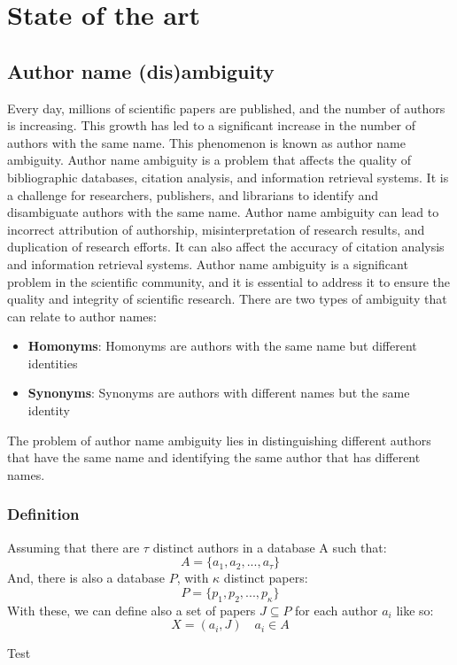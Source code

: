 \chapter{State of the art}
\label{chapters:state_of_the_art}

\section{Author name (dis)ambiguity}
\label{chapters:sections:author_name_ambiguity}
Every day, millions of scientific papers are published, and the number of authors is increasing. This growth has led to a significant increase in the number of authors with the same name. This phenomenon is known as author name ambiguity. Author name ambiguity is a problem that affects the quality of bibliographic databases, citation analysis, and information retrieval systems. It is a challenge for researchers, publishers, and librarians to identify and disambiguate authors with the same name. Author name ambiguity can lead to incorrect attribution of authorship, misinterpretation of research results, and duplication of research efforts. It can also affect the accuracy of citation analysis and information retrieval systems. Author name ambiguity is a significant problem in the scientific community, and it is essential to address it to ensure the quality and integrity of scientific research.
\break
There are two types of ambiguity that can relate to author names: 

\begin{itemize}
	\item \textbf{Homonyms}: Homonyms are authors with the same name but different identities
	\item \textbf{Synonyms}: Synonyms are authors with different names but the same identity
\end{itemize}

The problem of author name ambiguity lies in distinguishing different authors that have the same name and identifying the same author that has different names.

\subsection{Definition}
Assuming that there are $\tau$ distinct authors in a database A such that: 
\begin{displaymath}
	A = \{ a_1, a_2, ..., a_\tau \} 
\end{displaymath}
And, there is also a database $P$, with $\kappa$ distinct papers:
\begin{displaymath}
	P = \{ p_1, p_2, ..., p_\kappa \}
\end{displaymath}
With these, we can define also a set of papers $J \subseteq P$ for each author $a_i$ like so:
\begin{displaymath}
	X = (a_i, J) \quad a_i \in A
\end{displaymath}

Test
